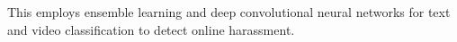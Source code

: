 This employs ensemble learning and deep convolutional neural networks for text and video classification to detect online harassment.